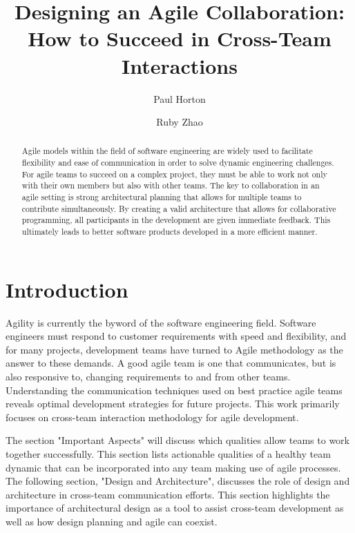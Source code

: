 \documentclass[sigplan,screen]{acmart}
\begin{document}
\title{Designing an Agile Collaboration: How to Succeed in Cross-Team Interactions}

\author{Paul Horton}

\author{Ruby Zhao}

\begin{abstract}
Agile models within the field of software engineering are widely used to facilitate flexibility and ease of communication in order to solve dynamic engineering challenges.
For agile teams to succeed on a complex project, they must be able to work not only with their own members but also with other teams.
The key to collaboration in an agile setting is strong architectural planning that allows for multiple teams to contribute simultaneously.
By creating a valid architecture that allows for collaborative programming, all participants in the development are given immediate feedback.
This ultimately leads to better software products developed in a more efficient manner.
\end{abstract}


\maketitle

\section{Introduction}
Agility is currently the byword of the software engineering field.
Software engineers must respond to customer requirements with speed and flexibility, and for many projects, development teams have turned to Agile methodology as the answer to these demands.
A good agile team is one that communicates, but is also responsive to, changing requirements to and from other teams.
Understanding the communication techniques used on best practice agile teams reveals optimal development strategies for future projects.
This work primarily focuses on cross-team interaction methodology for agile development.


The section "Important Aspects" will discuss which qualities allow teams to work together successfully.
This section lists actionable qualities of a healthy team dynamic that can be incorporated into any team making use of agile processes.
The following section, "Design and Architecture", discusses the role of design and architecture in cross-team communication efforts.
This section highlights the importance of architectural design as a tool to assist cross-team development as well as how design planning and agile can coexist.
\end{document}
